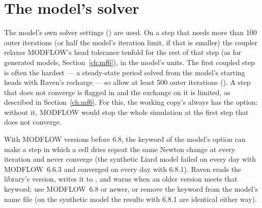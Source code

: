 \section{The model's solver}
The model's own solver settings () are used. On a step that needs more than 100 outer iterations (or half the
model's iteration limit, if that is smaller) the coupler relaxes
MODFLOW's head tolerance tenfold for the rest of that step (as for generated models, Section~\ref{ch:mf6}), in the model's
units. The first coupled step is often the hardest --- a steady-state period solved from the model's starting heads with
Raven's recharge --- so allow at least 500 outer iterations (). A step that does not converge is flagged
in  and the exchange on it is limited, as described in Section~\ref{ch:mf6}. For this, the working copy's
 always has the  option: without it, MODFLOW would stop the whole simulation at the first step
that does not converge.

With MODFLOW versions before 6.8, the  keyword of the model's  option can make a step in
which a cell dries repeat the same Newton change at every iteration and never converge (the synthetic Liard model failed on
every day with MODFLOW~6.6.3 and converged on every day with 6.8.1). Raven reads the library's version, writes it
to , and warns when an older version meets that keyword: use MODFLOW~6.8 or newer, or remove the
keyword from the model's name file (on the synthetic model the results with 6.8.1 are identical either way).

